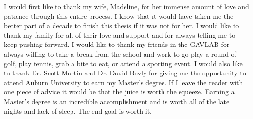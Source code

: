 \documentclass[12pt]{report}
\begin{document}
\begin{romanpages}
\begin{acknowledgments}
I would first like to thank my wife, Madeline, for her immense amount of love and patience through this entire process. I know that it would have taken me the better part of a decade to finish this thesis if it was not for her. I would like to thank my family for all of their love and support and for always telling me to keep pushing forward. I would like to thank my friends in the GAVLAB for always willing to take a break from the school and work to go play a round of golf, play tennis, grab a bite to eat, or attend a sporting event. I would also like to thank Dr. Scott Martin and Dr. David Bevly for giving me the opportunity to attend Auburn University to earn my Master's degree. If I leave the reader with one piece of advice it would be that the juice is worth the squeeze. Earning a Master's degree is an incredible accomplishment and is worth all of the late nights and lack of sleep. The end goal is worth it. 
\end{acknowledgments}

\begin{singlespace}

\begin{center} 
\renewcommand{\cftchapfont}{}
\renewcommand{\cftchappagefont}{}
\renewcommand{\cfttoctitlefont}{\normalsize}%
\renewcommand{\cftsecfont }{\normalsize}%
\renewcommand{\cftsecpagefont}{\normalsize}%
\tableofcontents 
\newpage
\renewcommand{\cftchapfont}{}
\renewcommand{\cftchappagefont}{}
\renewcommand{\cftloftitlefont}{\normalsize}%
\renewcommand{\cftsecfont}{\normalsize}%
\renewcommand{\cftsecpagefont}{\normalsize}%
\listoffigures
\newpage
\renewcommand{\cftchapfont}{}
\renewcommand{\cftchappagefont}{}
\renewcommand{\cftlottitlefont}{\normalsize}%
\renewcommand{\cftsecfont}{\normalsize}%
\renewcommand{\cftsecpagefont}{\normalsize}%
\listoftables
\end{center}
\end{singlespace}

\printnomenclature[0.5in] %
\end{romanpages}        %
\end{document}
